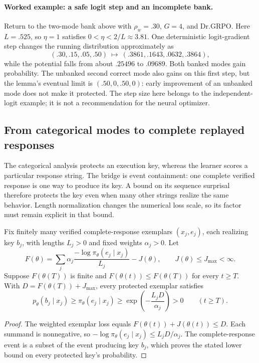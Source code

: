 \paragraph{Worked example: a safe logit step and an incomplete bank.}
Return to the two-mode bank above with $\rho_w=.30$, $G=4$, and Dr.GRPO.
Here $L=.525$, so $\eta=1$ satisfies $0<\eta<2/L\approx3.81$.
One deterministic logit-gradient step changes the running distribution
approximately as
\[
 (.30,.15,.05,.50)\ \longmapsto\ (.3861,.1643,.0632,.3864),
\]
while the potential falls from about $.25496$ to $.09689$.
Both banked modes gain probability. The unbanked second correct mode also
gains on this first step, but the lemma's eventual limit is
$(.50,0,.50,0)$: early improvement of an unbanked mode does not make it
protected. The step size here belongs to the independent-logit example;
it is not a recommendation for the neural optimizer.

\subsection{From categorical modes to complete replayed responses}
\label{app:theory-exemplar-bridge}

The categorical analysis protects an execution key, whereas the learner
scores a particular response string. The bridge is event containment: one
complete verified response is one way to produce its key. A bound on its
sequence surprisal therefore protects the key even when many other strings
realize the same behavior. Length normalization changes the numerical loss
scale, so its factor must remain explicit in that bound.

\begin{lemma}
\label{lem:shared-exemplar-retention}
Fix finitely many verified complete-response exemplars $(x_j,e_j)$, each
realizing key $b_j$, with lengths $L_j>0$ and fixed weights $\alpha_j>0$.
Let
\[
 F(\theta)=\sum_j\alpha_j
 \frac{-\log\pi_\theta(e_j\mid x_j)}{L_j}-J(\theta),
 \qquad J(\theta)\le J_{\max}<\infty.
\]
Suppose $F(\theta(T))$ is finite and
$F(\theta(t))\le F(\theta(T))$ for every $t\ge T$. With
$D=F(\theta(T))+J_{\max}$, every protected exemplar satisfies
\[
 p_\theta(b_j\mid x_j)\ge\pi_\theta(e_j\mid x_j)
 \ge\exp\!\left(-\frac{L_jD}{\alpha_j}\right)>0
 \qquad(t\ge T).
\]
\end{lemma}
\begin{proof}
The weighted exemplar loss equals $F(\theta(t))+J(\theta(t))\le D$.
Each summand is nonnegative, so
$-\log\pi_\theta(e_j\mid x_j)\le L_jD/\alpha_j$.
The complete-response event is a subset of the event producing key $b_j$,
which proves the stated lower bound on every protected key's probability.
\end{proof}

